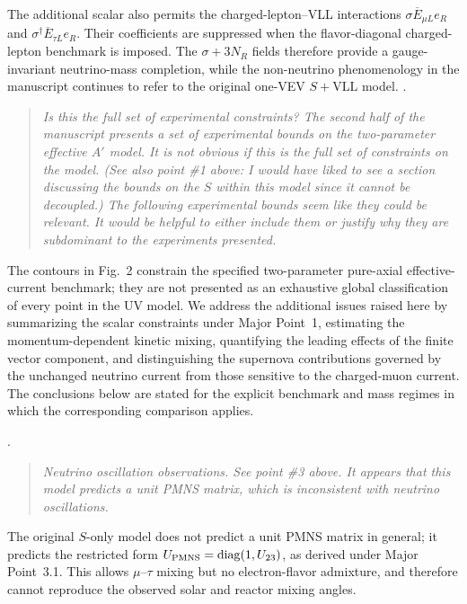 \documentclass[12pt,a4paper]{article}
\begin{document}
The additional scalar also permits the charged-lepton--VLL interactions \(\sigma\overline E_{\mu L}e_R\) and \(\sigma^\dagger\overline E_{\tau L}e_R\). Their coefficients are suppressed when the flavor-diagonal charged-lepton benchmark is imposed. The \(\sigma+3N_R\) fields therefore provide a gauge-invariant neutrino-mass completion, while the non-neutrino phenomenology in the manuscript continues to refer to the original one-VEV \(S+\mathrm{VLL}\) model.
\medskip
{}.
\begin{quote}\itshape
Is this the full set of experimental constraints? The second half of the manuscript presents a set of experimental bounds on the two-parameter effective \(A'\) model. It is not obvious if this is the full set of constraints on the model. (See also point \#1 above: I would have liked to see a section discussing the bounds on the \(S\) within this model since it cannot be decoupled.) The following experimental bounds seem like they could be relevant. It would be helpful to either include them or justify why they are subdominant to the experiments presented.
\end{quote}


The contours in Fig.~2 constrain the specified two-parameter pure-axial effective-current benchmark; they are not presented as an exhaustive global classification of every point in the UV model. We address the additional issues raised here by summarizing the scalar constraints under Major Point~1, estimating the momentum-dependent kinetic mixing, quantifying the leading effects of the finite vector component, and distinguishing the supernova contributions governed by the unchanged neutrino current from those sensitive to the charged-muon current. The conclusions below are stated for the explicit benchmark and mass regimes in which the corresponding comparison applies.

\medskip
{}.
\begin{quote}\itshape
Neutrino oscillation observations. See point \#3 above. It appears that this model predicts a unit PMNS matrix, which is inconsistent with neutrino oscillations.
\end{quote}


The original \(S\)-only model does not predict a unit PMNS matrix in general; it predicts the restricted form \(U_{\rm PMNS}=\operatorname{diag}(1,U_{23})\), as derived under Major Point~3.1. This allows \(\mu\)--\(\tau\) mixing but no electron-flavor admixture, and therefore cannot reproduce the observed solar and reactor mixing angles.
\end{document}
